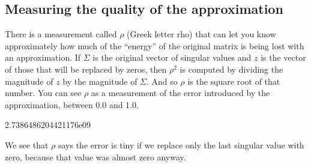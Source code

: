 \documentclass[letterpaper,10pt,english]{sphinxmanual}
\begin{document}
\subsection{Measuring the quality of the approximation}
\label{\detokenize{chapter-16-matrices:measuring-the-quality-of-the-approximation}}
There is a measurement called \(\rho\) (Greek letter rho) that can let you know approximately how much of the “energy” of the original matrix is being lost with an approximation.  If \(\Sigma\) is the original vector of singular values and \(z\) is the vector of those that will be replaced by zeros, then \(\rho^2\) is computed by dividing the magnitude of \(z\) by the magnitude of \(\Sigma\).  And so \(\rho\) is the square root of that number.  You can see \(\rho\) as a measurement of the error introduced by the approximation, between 0.0 and 1.0.

\begin{sphinxVerbatim}[commandchars=\\\{\}]
     
      \PYG{p}{[}\PYG{p}{]}
         
         
             

   
\end{sphinxVerbatim}

\begin{sphinxVerbatim}[commandchars=\\\{\}]
2.7386486204421176e\PYGZhy{}09
\end{sphinxVerbatim}

We see that \(\rho\) says the error is tiny if we replace only the last singular value with zero, because that value was almost zero anyway.

\begin{sphinxVerbatim}[commandchars=\\\{\}]
   
\end{sphinxVerbatim}
\end{document}
